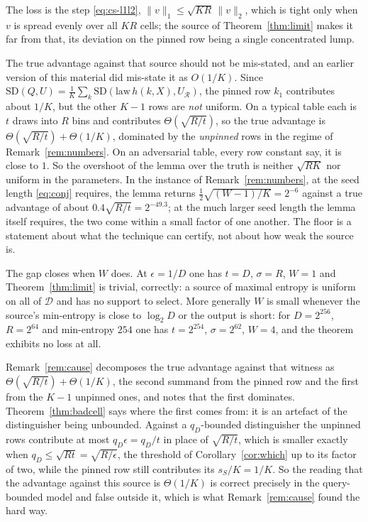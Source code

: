 \documentclass{aicr-solution}
\newcommand{\SD}{\mathrm{SD}}
\newcommand{\calD}{\mathcal{D}}
\newcommand{\calR}{\mathcal{R}}
\begin{document}
\begin{remark}\label{rem:cause}
The loss is the step \eqref{eq:cs-l1l2}, $\|v\|_1 \le \sqrt{KR}\,\|v\|_2$, which is tight only when
$v$ is spread evenly over all $KR$ cells; the source of Theorem~\ref{thm:limit} makes it far from
that, its deviation on the pinned row being a single concentrated lump.

The true advantage against that source should not be mis-stated, and an earlier version of this material
did mis-state it as $O(1/K)$. Since
$\SD(Q,U) = \frac1K\sum_k \SD(\mathrm{law}\,h(k,X), U_\calR)$, the pinned row $k_1$ contributes about
$1/K$, but the other $K-1$ rows are \emph{not} uniform. On a typical table each is $t$ draws into
$R$ bins and contributes $\Theta(\sqrt{R/t})$, so the true advantage is
$\Theta(\sqrt{R/t}) + \Theta(1/K)$, dominated by the \emph{unpinned} rows in the regime of
Remark~\ref{rem:numbers}. On an adversarial table, every row constant say, it is close to
$1$. So the overshoot of the lemma over the truth is neither $\sqrt{RK}$ nor uniform in the
parameters. In the instance of Remark~\ref{rem:numbers}, at the seed length \eqref{eq:conj}
requires, the lemma returns $\tfrac12\sqrt{(W-1)/K} = 2^{-6}$ against a true advantage of about
$0.4\sqrt{R/t} = 2^{-49.3}$; at the much larger seed length the lemma itself requires, the two come
within a small factor of one another. The floor is a statement about what the technique can certify,
not about how weak the source is.

The gap closes when $W$ does. At $\epsilon = 1/D$ one has $t = D$, $\sigma = R$, $W = 1$ and
Theorem~\ref{thm:limit} is trivial, correctly: a source of maximal entropy is uniform on all of
$\calD$ and has no support to select. More generally $W$ is small whenever the source's min-entropy
is close to $\log_2 D$ or the output is short: for $D = 2^{256}$, $R = 2^{64}$ and min-entropy $254$
one has $t = 2^{254}$, $\sigma = 2^{62}$, $W = 4$, and the theorem exhibits no loss at all.
\end{remark}

\begin{remark}\label{rem:qwitness}
Remark~\ref{rem:cause} decomposes the true advantage against that witness as
$\Theta(\sqrt{R/t}) + \Theta(1/K)$, the second summand from the pinned row and the first from the
$K-1$ unpinned ones, and notes that the first dominates. Theorem~\ref{thm:badcell} says where the
first comes from: it is an artefact of the distinguisher being unbounded. Against a $q_D$-bounded
distinguisher the unpinned rows contribute at most $q_D\epsilon = q_D/t$ in place of
$\sqrt{R/t}$, which is smaller exactly when $q_D \le \sqrt{Rt} = \sqrt{R/\epsilon}$, the threshold
of Corollary~\ref{cor:which} up to its factor of two, while the pinned row still contributes its
$s_S/K = 1/K$. So the reading that the advantage against this source is $\Theta(1/K)$ is correct precisely in the
query-bounded model and false outside it, which is what Remark~\ref{rem:cause} found the hard way.
\end{remark}
\end{document}
